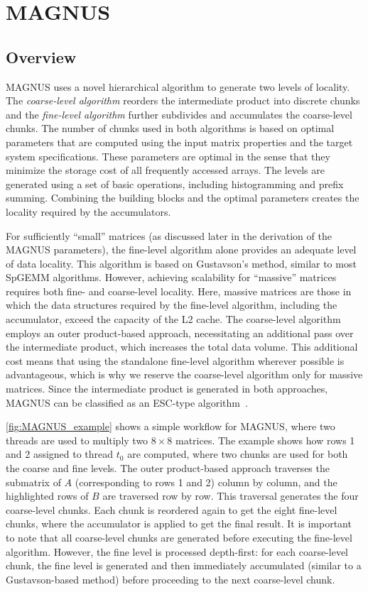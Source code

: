 \section{MAGNUS}\label{sec:magnus}
\subsection{Overview}
MAGNUS uses a novel hierarchical algorithm to generate two levels of locality.
The \emph{coarse-level algorithm} reorders the intermediate product into discrete chunks
and the \emph{fine-level algorithm} further subdivides and accumulates the coarse-level chunks.
The number of chunks used in both algorithms is based on optimal parameters that are computed using the
input matrix properties and the target system specifications.
These parameters are optimal in the sense that they minimize the storage cost of all frequently accessed arrays.
The levels are generated using a set of basic operations, including histogramming and prefix summing.
Combining the building blocks and the optimal parameters creates the locality required by the accumulators.

For sufficiently ``small'' matrices (as discussed later in the derivation of the MAGNUS parameters), the fine-level algorithm alone provides an adequate level of data locality. This algorithm is based on Gustavson's method, similar to most SpGEMM algorithms. However, achieving scalability for ``massive'' matrices requires both fine- and coarse-level locality. Here, massive matrices are those in which the data structures required by the fine-level algorithm, including the accumulator, exceed the capacity of the L2 cache. The coarse-level algorithm employs an outer product-based approach, necessitating an additional pass over the intermediate product, which increases the total data volume.
This additional cost means that using the standalone fine-level algorithm wherever possible is advantageous, which is why we reserve the coarse-level algorithm only for massive matrices.
Since the intermediate product is generated in both approaches, MAGNUS can be classified as an ESC-type algorithm~\cite{ESC}.

\autoref{fig:MAGNUS_example} shows a simple workflow for MAGNUS, where two threads are used to multiply two $8\times 8$ matrices.
The example shows how rows 1 and 2 assigned to thread $t_0$ are computed, where two chunks are used for both the coarse and fine levels.
The outer product-based approach traverses the submatrix of $A$ (corresponding to rows 1 and 2) column by column, and the highlighted rows of $B$ are traversed row by row.
This traversal generates the four coarse-level chunks.
Each chunk is reordered again to get the eight fine-level chunks, where the accumulator is applied to get the final result.
It is important to note that all coarse-level chunks are generated before executing the fine-level algorithm.
However, the fine level is processed depth-first: for each coarse-level chunk, the fine level is generated and then immediately accumulated (similar to a Gustavson-based method) before proceeding to the next coarse-level chunk.

